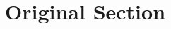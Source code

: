 \documentclass[a4paper,12pt]{responseletter}
\begin{document}
\section{Original Section}\label{section}
\end{document}
